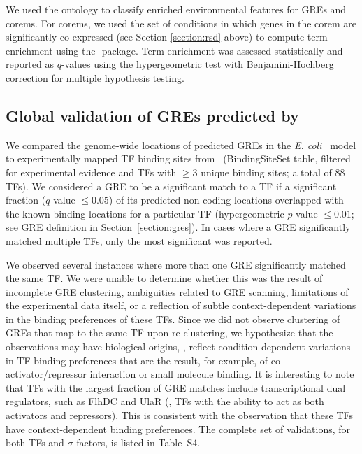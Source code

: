 We used the ontology to classify enriched environmental features for GREs and corems. For corems, we used the set of conditions in which genes in the corem are significantly co-expressed (see Section \ref{section:rsd} above) to compute term enrichment using the  \cite{kurbatova_ontocat:_2011}  -package. Term enrichment was assessed statistically and reported as $q$-values using the hypergeometric test with Benjamini-Hochberg correction for multiple hypothesis testing.


\subsection{Global validation of GREs predicted by \egrine}
\label{section:tfbs:vs:regdb}

We compared the genome-wide locations of predicted GREs in the {\it E. coli} \egrine~model to experimentally mapped TF binding sites from \rdb~(BindingSiteSet table, filtered for experimental evidence and TFs with $\geq 3$ unique binding sites; a total of 88 TFs). We considered a GRE to be a significant match to a TF if a significant fraction ($q$-value $\leq 0.05$) of its predicted non-coding locations overlapped with the known binding locations for a particular TF (hypergeometric $p$-value $\leq 0.01$; see GRE definition in Section~\ref{section:gres}). In cases where a GRE significantly matched multiple TFs, only the most significant was reported.

We observed several instances where more than one GRE significantly matched the same TF. We were unable to determine whether this was the result of incomplete GRE clustering, ambiguities related to GRE scanning, limitations of the experimental data itself, or a reflection of subtle context-dependent variations in the binding preferences of these TFs. Since we did not observe clustering of GREs that map to the same TF upon re-clustering, we hypothesize that the observations may have biological origins, \ie, reflect condition-dependent variations in TF binding preferences that are the result, for example, of co-activator/repressor interaction or small molecule binding. It is interesting to note that TFs with the largest fraction of GRE matches include transcriptional dual regulators, such as FlhDC and UlaR (\ie, TFs with the ability to act as both activators and repressors). This is consistent with the observation that these TFs have context-dependent binding preferences. The complete set of validations, for both TFs and $\sigma$-factors, is listed in Table~S4.

